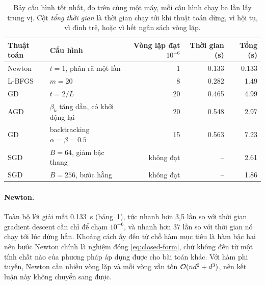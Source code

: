 \begin{table}[tp]
  \centering
  \caption{Bảy cấu hình tốt nhất, đo trên cùng một máy, mỗi cấu hình chạy ba lần
    lấy trung vị. Cột \emph{tổng thời gian} là thời gian chạy tới khi thuật toán
    dừng, vì hội tụ, vì đình trệ, hoặc vì hết ngân sách vòng lặp.}
  \label{tab:summary}
  \begin{tabular}{llrrr}
    \toprule
    Thuật toán & Cấu hình & Vòng lặp đạt $10^{-6}$ & Thời gian (s) & Tổng (s) \\
    \midrule
    Newton   & $t = 1$, phân rã một lần          & 1         & \num{0.133} & \num{0.133} \\
    L-BFGS   & $m = 20$                          & 8         & \num{0.282} & \num{1.49}  \\
    GD       & $t = 2/L$                         & 20        & \num{0.465} & \num{4.99}  \\
    AGD      & $\beta_k$ tăng dần, có khởi động lại & 20     & \num{0.548} & \num{2.97}  \\
    GD       & backtracking $\alpha = \beta = 0.5$ & 15      & \num{0.563} & \num{7.23}  \\
    SGD      & $B = 64$, giảm bậc thang          & không đạt & --          & \num{2.61}  \\
    SGD      & $B = 256$, bước hằng              & không đạt & --          & \num{1.86}  \\
    \bottomrule
  \end{tabular}
\end{table}

\paragraph{Newton.} Toàn bộ lời giải mất \SI{0.133}{\second}
(bảng~\ref{tab:summary}), tức nhanh hơn 3,5 lần so với thời gian gradient descent
cần chỉ để chạm $10^{-6}$, và nhanh hơn 37 lần so với thời gian nó chạy tới lúc
dừng hẳn. Khoảng cách ấy đến từ chỗ hàm mục tiêu là hàm bậc hai nên bước Newton
chính là nghiệm
đóng \eqref{eq:closed-form}, chứ không đến từ một tính chất nào của phương pháp
áp dụng được cho bài toán khác. Với hàm phi tuyến, Newton cần nhiều vòng lặp và
mỗi vòng vẫn tốn $\mathcal{O}(nd^{2} + d^{3})$, nên kết luận này không chuyển sang được.

